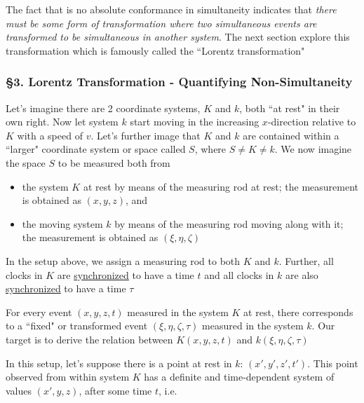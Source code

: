 The fact that is no absolute conformance in simultaneity indicates that \textit{there must be some form of
transformation where two simultaneous events are transformed to be simultaneous in another system}. The next section
explore this transformation which is famously called the ``Lorentz transformation"

\subsubsection{\hfil \S3. Lorentz Transformation - Quantifying Non-Simultaneity \hfil}

\begin{tcolorbox}[
    breakable,
    enhanced,
    arc=3mm,
    boxrule=1.5mm,
    boxsep=1.5mm,
    colback=yellow!20!white,
    colframe=blue,
    borderline={1mm}{1mm}{white},
    borderline={1mm}{2mm}{red}
]
    Let's imagine there are 2 coordinate systems, $K$ and $k$, both ``at rest" in their own right. Now let system $k$
    start moving in the increasing $x$-direction relative to $K$ with a speed of $v$. Let's further image that $K$ and
    $k$ are contained within a ``larger" coordinate system or space called $S$, where $S \ne K \ne k$. We now imagine
    the space $S$ to be measured both from

    \begin{itemize}
        \item the system $K$ at rest by means of the measuring rod at rest; the measurement is obtained as $(x, y, z)$,
              and
        \item the moving system $k$ by means of the measuring rod moving along with it; the measurement is obtained as
              $(\xi, \eta, \zeta)$
    \end{itemize}

    In the setup above, we assign a measuring rod to both $K$ and $k$. Further, all clocks in $K$ are
    \hyperref[def:synchronism]{synchronized} to have a time $t$ and all clocks in $k$ are also
    \hyperref[def:synchronism]{synchronized} to have a time $\tau$

    For every event $(x, y, z, t)$ measured in the system $K$ at rest, there corresponds to a ``fixed" or transformed
    event $(\xi, \eta, \zeta, \tau)$ measured in the system $k$. Our target is to derive the relation between
    $K(x, y, z, t)$ and $k(\xi, \eta, \zeta, \tau)$
\end{tcolorbox}

In this setup, let's suppose there is a point at rest in $k$: $(x', y', z', t')$. This point observed from within system $K$ has a definite
and time-dependent system of values $(x', y, z)$, after some time $t$, i.e.

